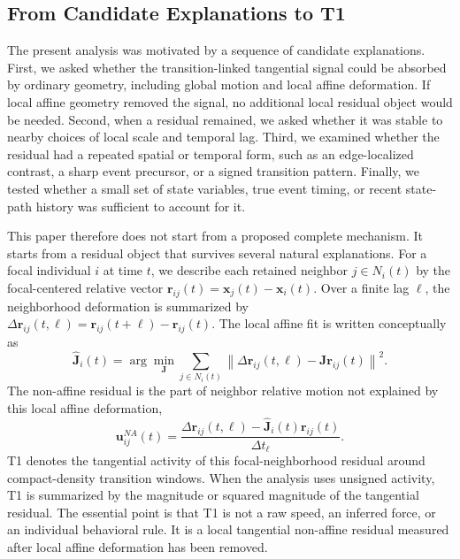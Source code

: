 \subsection{From Candidate Explanations to T1}

The present analysis was motivated by a sequence of candidate explanations.
First, we asked whether the transition-linked tangential signal could be
absorbed by ordinary geometry, including global motion and local affine
deformation. If local affine geometry removed the signal, no additional local
residual object would be needed. Second, when a residual remained, we asked
whether it was stable to nearby choices of local scale and temporal lag. Third,
we examined whether the residual had a repeated spatial or temporal form, such
as an edge-localized contrast, a sharp event precursor, or a signed transition
pattern. Finally, we tested whether a small set of state variables, true event
timing, or recent state-path history was sufficient to account for it.

This paper therefore does not start from a proposed complete mechanism. It
starts from a residual object that survives several natural explanations. For
a focal individual \(i\) at time \(t\), we describe each retained neighbor
\(j\in N_i(t)\) by the focal-centered relative vector
\(\mathbf{r}_{ij}(t)=\mathbf{x}_j(t)-\mathbf{x}_i(t)\). Over a finite lag
\(\ell\), the neighborhood deformation is summarized by
\(\Delta\mathbf{r}_{ij}(t,\ell)=\mathbf{r}_{ij}(t+\ell)-\mathbf{r}_{ij}(t)\).
The local affine fit is written conceptually as
\begin{equation}
\hat{\mathbf{J}}_i(t)
=
\arg\min_{\mathbf{J}}
\sum_{j\in N_i(t)}
\left\|
\Delta\mathbf{r}_{ij}(t,\ell)
-
\mathbf{J}\mathbf{r}_{ij}(t)
\right\|^2 .
\end{equation}
The non-affine residual is the part of neighbor relative motion not explained
by this local affine deformation,
\begin{equation}
\mathbf{u}^{NA}_{ij}(t)=
\frac{
\Delta\mathbf{r}_{ij}(t,\ell)
-
\hat{\mathbf{J}}_i(t)\mathbf{r}_{ij}(t)
}{\Delta t_{\ell}}.
\end{equation}
T1 denotes the tangential activity of this focal-neighborhood residual around
compact-density transition windows. When the analysis uses unsigned activity,
T1 is summarized by the magnitude or squared magnitude of the tangential
residual. The essential point is that T1 is not a raw speed, an inferred force,
or an individual behavioral rule. It is a local tangential non-affine residual
measured after local affine deformation has been removed.

